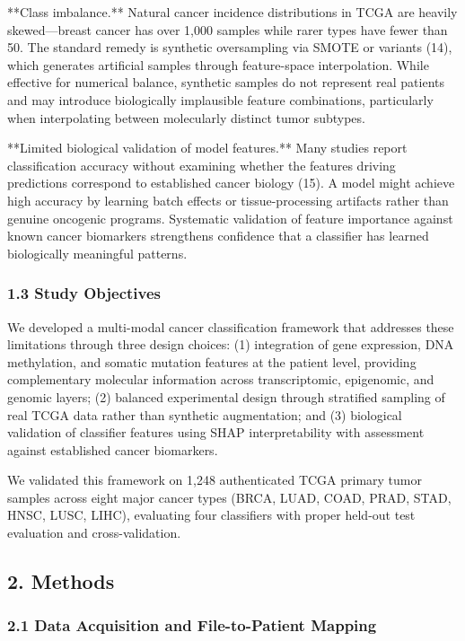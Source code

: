 **Class imbalance.** Natural cancer incidence distributions in TCGA are
heavily skewed---breast cancer has over 1,000 samples while rarer types
have fewer than 50. The standard remedy is synthetic oversampling via
SMOTE or variants (14), which generates artificial samples through
feature-space interpolation. While effective for numerical balance,
synthetic samples do not represent real patients and may introduce
biologically implausible feature combinations, particularly when
interpolating between molecularly distinct tumor subtypes.

**Limited biological validation of model features.** Many studies report
classification accuracy without examining whether the features driving
predictions correspond to established cancer biology (15). A model might
achieve high accuracy by learning batch effects or tissue-processing
artifacts rather than genuine oncogenic programs. Systematic validation
of feature importance against known cancer biomarkers strengthens
confidence that a classifier has learned biologically meaningful
patterns.

\subsubsection{1.3 Study Objectives}\label{study-objectives}

We developed a multi-modal cancer classification framework that
addresses these limitations through three design choices: (1)
integration of gene expression, DNA methylation, and somatic mutation
features at the patient level, providing complementary molecular
information across transcriptomic, epigenomic, and genomic layers; (2)
balanced experimental design through stratified sampling of real TCGA
data rather than synthetic augmentation; and (3) biological validation
of classifier features using SHAP interpretability with assessment
against established cancer biomarkers.

We validated this framework on 1,248 authenticated TCGA primary tumor
samples across eight major cancer types (BRCA, LUAD, COAD, PRAD, STAD,
HNSC, LUSC, LIHC), evaluating four classifiers with proper held-out test
evaluation and cross-validation.

\subsection{2. Methods}\label{methods}

\subsubsection{2.1 Data Acquisition and File-to-Patient
Mapping}\label{data-acquisition-and-file-to-patient-mapping}

